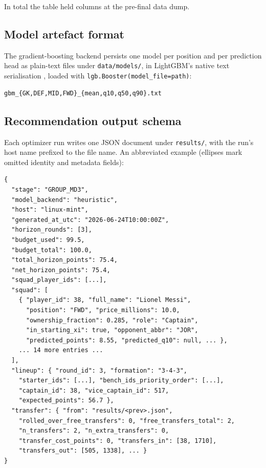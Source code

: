 In total the table held \FeatureColumnCount{} columns at the
pre-final data dump.

\subsection{Model artefact format}
\label{sec:appendix-a-models}

{\sloppy
The gradient-boosting backend persists one model per position and per
prediction head as plain-text files under \texttt{data/models/}, in
LightGBM's native text serialisation \citep{ke2017lightgbm}, loaded
with \texttt{lgb.Booster(model\_file=path)}:\par}

\begin{verbatim}
gbm_{GK,DEF,MID,FWD}_{mean,q10,q50,q90}.txt
\end{verbatim}

\subsection{Recommendation output schema}
\label{sec:appendix-a-results}

Each optimizer run writes one JSON document under \texttt{results/},
with the run's host name prefixed to the file name. An abbreviated
example (ellipses mark omitted identity and metadata fields):

\begin{verbatim}
{
  "stage": "GROUP_MD3",
  "model_backend": "heuristic",
  "host": "linux-mint",
  "generated_at_utc": "2026-06-24T10:00:00Z",
  "horizon_rounds": [3],
  "budget_used": 99.5,
  "budget_total": 100.0,
  "total_horizon_points": 75.4,
  "net_horizon_points": 75.4,
  "squad_player_ids": [...],
  "squad": [
    { "player_id": 38, "full_name": "Lionel Messi",
      "position": "FWD", "price_millions": 10.0,
      "ownership_fraction": 0.285, "role": "Captain",
      "in_starting_xi": true, "opponent_abbr": "JOR",
      "predicted_points": 8.55, "predicted_q10": null, ... },
    ... 14 more entries ...
  ],
  "lineup": { "round_id": 3, "formation": "3-4-3",
    "starter_ids": [...], "bench_ids_priority_order": [...],
    "captain_id": 38, "vice_captain_id": 517,
    "expected_points": 56.7 },
  "transfer": { "from": "results/<prev>.json",
    "rolled_over_free_transfers": 0, "free_transfers_total": 2,
    "n_transfers": 2, "n_extra_transfers": 0,
    "transfer_cost_points": 0, "transfers_in": [38, 1710],
    "transfers_out": [505, 1338], ... }
}
\end{verbatim}

